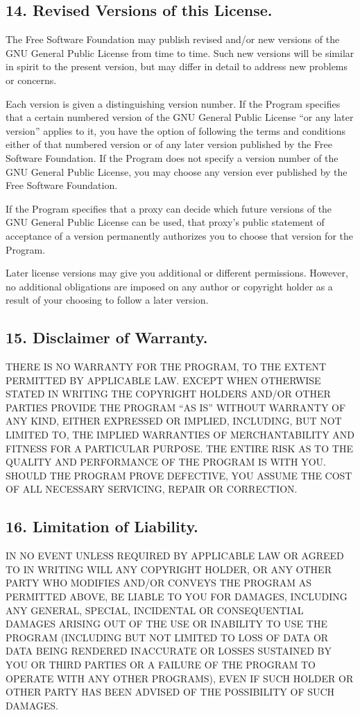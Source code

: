 \subsection{14. Revised Versions of this License.}
The Free Software Foundation may publish revised and/or new versions of the GNU General Public License from time to time. Such new versions will be similar in spirit to the present version, but may differ in detail to address new problems or concerns.\par
Each version is given a distinguishing version number. If the Program specifies that a certain numbered version of the GNU General Public License “or any later version” applies to it, you have the option of following the terms and conditions either of that numbered version or of any later version published by the Free Software Foundation. If the Program does not specify a version number of the GNU General Public License, you may choose any version ever published by the Free Software Foundation.\par
If the Program specifies that a proxy can decide which future versions of the GNU General Public License can be used, that proxy's public statement of acceptance of a version permanently authorizes you to choose that version for the Program.\par
Later license versions may give you additional or different permissions. However, no additional obligations are imposed on any author or copyright holder as a result of your choosing to follow a later version.
\subsection{15. Disclaimer of Warranty.}
THERE IS NO WARRANTY FOR THE PROGRAM, TO THE EXTENT PERMITTED BY APPLICABLE LAW. EXCEPT WHEN OTHERWISE STATED IN WRITING THE COPYRIGHT HOLDERS AND/OR OTHER PARTIES PROVIDE THE PROGRAM “AS IS” WITHOUT WARRANTY OF ANY KIND, EITHER EXPRESSED OR IMPLIED, INCLUDING, BUT NOT LIMITED TO, THE IMPLIED WARRANTIES OF MERCHANTABILITY AND FITNESS FOR A PARTICULAR PURPOSE. THE ENTIRE RISK AS TO THE QUALITY AND PERFORMANCE OF THE PROGRAM IS WITH YOU. SHOULD THE PROGRAM PROVE DEFECTIVE, YOU ASSUME THE COST OF ALL NECESSARY SERVICING, REPAIR OR CORRECTION.
\subsection{16. Limitation of Liability.}
IN NO EVENT UNLESS REQUIRED BY APPLICABLE LAW OR AGREED TO IN WRITING WILL ANY COPYRIGHT HOLDER, OR ANY OTHER PARTY WHO MODIFIES AND/OR CONVEYS THE PROGRAM AS PERMITTED ABOVE, BE LIABLE TO YOU FOR DAMAGES, INCLUDING ANY GENERAL, SPECIAL, INCIDENTAL OR CONSEQUENTIAL DAMAGES ARISING OUT OF THE USE OR INABILITY TO USE THE PROGRAM (INCLUDING BUT NOT LIMITED TO LOSS OF DATA OR DATA BEING RENDERED INACCURATE OR LOSSES SUSTAINED BY YOU OR THIRD PARTIES OR A FAILURE OF THE PROGRAM TO OPERATE WITH ANY OTHER PROGRAMS), EVEN IF SUCH HOLDER OR OTHER PARTY HAS BEEN ADVISED OF THE POSSIBILITY OF SUCH DAMAGES.

